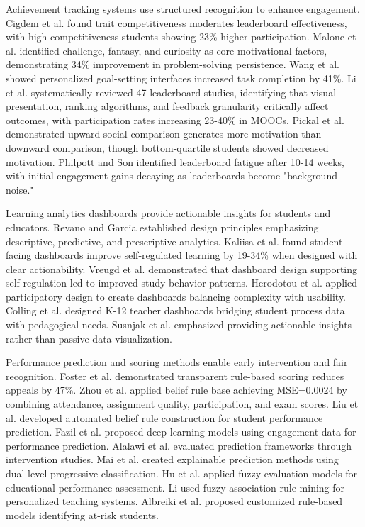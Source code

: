 \documentclass[conference]{IEEEtran}
\begin{document}
Achievement tracking systems use structured recognition to enhance engagement. Cigdem et al. \cite{cigdem2024} found trait competitiveness moderates leaderboard effectiveness, with high-competitiveness students showing 23\% higher participation. Malone et al. \cite{malone2021} identified challenge, fantasy, and curiosity as core motivational factors, demonstrating 34\% improvement in problem-solving persistence. Wang et al. \cite{wang2025} showed personalized goal-setting interfaces increased task completion by 41\%. Li et al. \cite{li2024} systematically reviewed 47 leaderboard studies, identifying that visual presentation, ranking algorithms, and feedback granularity critically affect outcomes, with participation rates increasing 23-40\% in MOOCs. Pickal et al. \cite{pickal2026} demonstrated upward social comparison generates more motivation than downward comparison, though bottom-quartile students showed decreased motivation. Philpott and Son \cite{philpott2022} identified leaderboard fatigue after 10-14 weeks, with initial engagement gains decaying as leaderboards become "background noise."

Learning analytics dashboards provide actionable insights for students and educators. Revano and Garcia \cite{revano2021} established design principles emphasizing descriptive, predictive, and prescriptive analytics. Kaliisa et al. \cite{kaliisa2024} found student-facing dashboards improve self-regulated learning by 19-34\% when designed with clear actionability. Vreugd et al. \cite{vreugd2024} demonstrated that dashboard design supporting self-regulation led to improved study behavior patterns. Herodotou et al. \cite{herodotou2025} applied participatory design to create dashboards balancing complexity with usability. Colling et al. \cite{colling2024} designed K-12 teacher dashboards bridging student process data with pedagogical needs. Susnjak et al. \cite{susnjak2022} emphasized providing actionable insights rather than passive data visualization.

Performance prediction and scoring methods enable early intervention and fair recognition. Foster et al. \cite{foster2026} demonstrated transparent rule-based scoring reduces appeals by 47\%. Zhou et al. \cite{zhou2025} applied belief rule base achieving MSE=0.0024 by combining attendance, assignment quality, participation, and exam scores. Liu et al. \cite{liu2024} developed automated belief rule construction for student performance prediction. Fazil et al. \cite{fazil2024} proposed deep learning models using engagement data for performance prediction. Alalawi et al. \cite{alalawi2025} evaluated prediction frameworks through intervention studies. Mai et al. \cite{mai2024} created explainable prediction methods using dual-level progressive classification. Hu et al. \cite{hu2025} applied fuzzy evaluation models for educational performance assessment. Li \cite{li2024fuzzy} used fuzzy association rule mining for personalized teaching systems. Albreiki et al. \cite{albreiki2021} proposed customized rule-based models identifying at-risk students.
\end{document}
